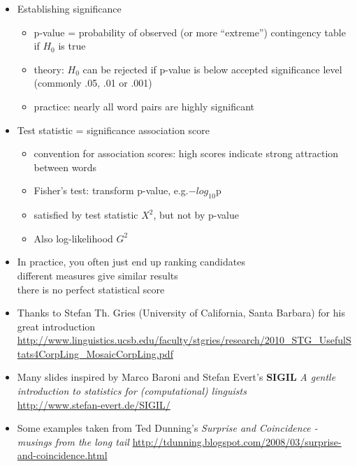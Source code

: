 \documentclass[a4paper,landscape,headrule,footrule,dvips]{foils}
\begin{document}
\begin{CJK}{UTF8}{min}
\begin{itemize}
\item Establishing significance
  \begin{itemize}
  \item p-value = probability of observed (or more “extreme”)
contingency table if $H_0$ is true
\item theory: $H_0$ can be rejected if p-value is below accepted
significance level (commonly .05, .01 or .001)
\item practice: nearly all word pairs are highly significant
\end{itemize}
\newpage
\item Test statistic = significance association score
\begin{itemize}
\item convention for association scores: high scores indicate
strong attraction between words
\item Fisher’s test: transform p-value, e.g.$-log_{10}$p
\item satisfied by test statistic $X^2$, but not by p-value
\item Also log-likelihood $G^2$
\end{itemize}
\item In practice, you often just end up ranking candidates
  \\ different measures give similar results
  \\ there is no perfect statistical score
\end{itemize}



 \begin{itemize}
 \item Thanks to Stefan Th. Gries (University of California, Santa
   Barbara) for his great introduction \href{Useful statistics for
     corpus
linguistics}{http://www.linguistics.ucsb.edu/faculty/stgries/research/2010_STG_UsefulStats4CorpLing_MosaicCorpLing.pdf}
 \item Many slides inspired by Marco Baroni and Stefan Evert's
   \textbf{SIGIL} \textit{A gentle introduction to statistics for
   (computational) linguists}
 \\ \url{http://www.stefan-evert.de/SIGIL/} 
 \item Some examples taken from Ted Dunning's \textit{Surprise and
     Coincidence - musings from the long tail}
   \url{http://tdunning.blogspot.com/2008/03/surprise-and-coincidence.html}
 \end{itemize}

\clearpage
\end{CJK}
\end{document}
